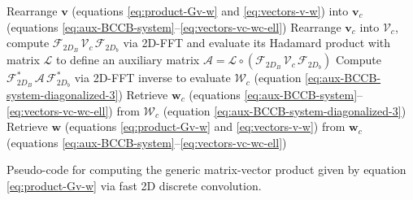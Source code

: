 \begin{algorithm}
	Rearrange $\mathbf{v}$ (equations \ref{eq:product-Gv-w} and \ref{eq:vectors-v-w}) into $\mathbf{v}_{c}$
	(equations \ref{eq:aux-BCCB-system}--\ref{eq:vectors-vc-wc-ell})\;
	Rearrange $\mathbf{v}_{c}$ into $\boldsymbol{\mathcal{V}}_{c}$, compute $\boldsymbol{\mathcal{F}}_{2D_{B}} \, \boldsymbol{\mathcal{V}}_{c} \, \boldsymbol{\mathcal{F}}_{2D_{b}}$ via 2D-FFT and evaluate its Hadamard product with matrix $\boldsymbol{\mathcal{L}}$ to define
	an auxiliary matrix $\boldsymbol{\mathcal{A}} = \boldsymbol{\mathcal{L}} \circ 
	\left( \boldsymbol{\mathcal{F}}_{2D_{B}} \, \boldsymbol{\mathcal{V}}_{c} \, \boldsymbol{\mathcal{F}}_{2D_{b}} \right)$\;
	Compute $\boldsymbol{\mathcal{F}}_{2D_{B}}^{\ast} \, \boldsymbol{\mathcal{A}} \, \boldsymbol{\mathcal{F}}_{2D_{b}}^{\ast}$ via 
	2D-FFT inverse to evaluate $\boldsymbol{\mathcal{W}}_{c}$ (equation \ref{eq:aux-BCCB-system-diagonalized-3})\;
	Retrieve $\mathbf{w}_{c}$ (equations \ref{eq:aux-BCCB-system}--\ref{eq:vectors-vc-wc-ell}) from $\boldsymbol{\mathcal{W}}_{c}$ (equation \ref{eq:aux-BCCB-system-diagonalized-3})\;
	Retrieve $\mathbf{w}$ (equations \ref{eq:product-Gv-w} and \ref{eq:vectors-v-w}) from $\mathbf{w}_{c}$
	(equations \ref{eq:aux-BCCB-system}--\ref{eq:vectors-vc-wc-ell})\;
	\caption{Pseudo-code for computing the generic matrix-vector product given by equation \ref{eq:product-Gv-w} via 
		fast 2D discrete convolution.}
	\label{alg:fast-2D-convolution}
\end{algorithm}

%

